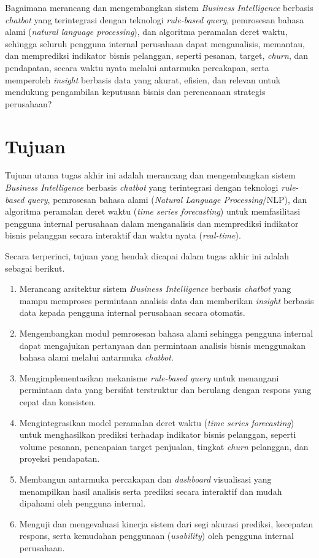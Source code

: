 Bagaimana merancang dan mengembangkan sistem \textit{Business Intelligence} berbasis \textit{chatbot} yang terintegrasi dengan teknologi \textit{rule-based query}, pemrosesan bahasa alami (\textit{natural language processing}), dan algoritma peramalan deret waktu, sehingga seluruh pengguna internal perusahaan dapat menganalisis, memantau, dan memprediksi indikator bisnis pelanggan, seperti pesanan, target, \textit{churn}, dan pendapatan, secara waktu nyata melalui antarmuka percakapan, serta memperoleh \textit{insight} berbasis data yang akurat, efisien, dan relevan untuk mendukung pengambilan keputusan bisnis dan perencanaan strategis perusahaan?

\section{Tujuan}

Tujuan utama tugas akhir ini adalah merancang dan mengembangkan sistem \textit{Business Intelligence} berbasis \textit{chatbot} yang terintegrasi dengan teknologi \textit{rule-based query}, pemrosesan bahasa alami (\textit{Natural Language Processing}/NLP), dan algoritma peramalan deret waktu (\textit{time series forecasting}) untuk memfasilitasi pengguna internal perusahaan dalam menganalisis dan memprediksi indikator bisnis pelanggan secara interaktif dan waktu nyata (\textit{real-time}).

Secara terperinci, tujuan yang hendak dicapai dalam tugas akhir ini adalah sebagai berikut.
\begin{enumerate}
  \item Merancang arsitektur sistem \textit{Business Intelligence} berbasis \textit{chatbot} yang mampu memproses permintaan analisis data dan memberikan \textit{insight} berbasis data kepada pengguna internal perusahaan secara otomatis.
  \item Mengembangkan modul pemrosesan bahasa alami sehingga pengguna internal dapat mengajukan pertanyaan dan permintaan analisis bisnis menggunakan bahasa alami melalui antarmuka \textit{chatbot}.
  \item Mengimplementasikan mekanisme \textit{rule-based query} untuk menangani permintaan data yang bersifat terstruktur dan berulang dengan respons yang cepat dan konsisten.
  \item Mengintegrasikan model peramalan deret waktu (\textit{time series forecasting}) untuk menghasilkan prediksi terhadap indikator bisnis pelanggan, seperti volume pesanan, pencapaian target penjualan, tingkat \textit{churn} pelanggan, dan proyeksi pendapatan.
  \item Membangun antarmuka percakapan dan \textit{dashboard} visualisasi yang menampilkan hasil analisis serta prediksi secara interaktif dan mudah dipahami oleh pengguna internal.
  \item Menguji dan mengevaluasi kinerja sistem dari segi akurasi prediksi, kecepatan respons, serta kemudahan penggunaan (\textit{usability}) oleh pengguna internal perusahaan.
\end{enumerate}

